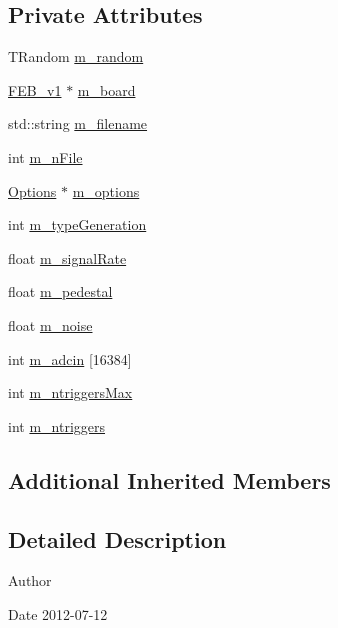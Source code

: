 \subsection*{Private Attributes}
\begin{DoxyCompactItemize}
\item 
T\+Random \hyperlink{classEmulateFE_a7f883bc6fb5bde2c98e464ef74e5c643}{m\+\_\+random}
\item 
\hyperlink{classFEB__v1}{F\+E\+B\+\_\+v1} $\ast$ \hyperlink{classEmulateFE_a6f3c6a104235b167e4465f4169cf8304}{m\+\_\+board}
\item 
std\+::string \hyperlink{classEmulateFE_a103fedea9eb5d3963573f9120cb81a68}{m\+\_\+filename}
\item 
int \hyperlink{classEmulateFE_a04ed956f5992c36590dd5a6abc19de2c}{m\+\_\+n\+File}
\item 
\hyperlink{classOptions}{Options} $\ast$ \hyperlink{classEmulateFE_a2f2da7d4b2164c47673a6ecc6dcef1ea}{m\+\_\+options}
\item 
int \hyperlink{classEmulateFE_aa8bd0aa42cc5f3d52930408807b3067c}{m\+\_\+type\+Generation}
\item 
float \hyperlink{classEmulateFE_a7aeff9e62f850ca6d7ee27dce02a060b}{m\+\_\+signal\+Rate}
\item 
float \hyperlink{classEmulateFE_a033996ce759c11305395ac865a6c074a}{m\+\_\+pedestal}
\item 
float \hyperlink{classEmulateFE_a74f8720a1da5806fad3811339ef9b98f}{m\+\_\+noise}
\item 
int \hyperlink{classEmulateFE_a647be38c790d5c0088e971aa28989589}{m\+\_\+adcin} \mbox{[}16384\mbox{]}
\item 
int \hyperlink{classEmulateFE_a2d473d12faf30f4870458874d70c7f55}{m\+\_\+ntriggers\+Max}
\item 
int \hyperlink{classEmulateFE_a8df57e3d66bde60e9a79cb2ae54a9f4a}{m\+\_\+ntriggers}
\end{DoxyCompactItemize}
\subsection*{Additional Inherited Members}


\subsection{Detailed Description}
\begin{DoxyAuthor}{Author}

\end{DoxyAuthor}
\begin{DoxyDate}{Date}
2012-\/07-\/12 
\end{DoxyDate}


